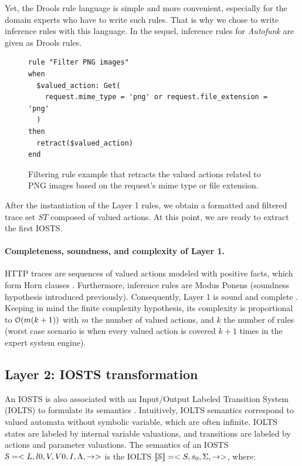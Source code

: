 Yet, the Drools rule language is simple and more convenient,
especially for the domain experts who have to write such rules.
That is why we chose to write inference rules with this language.
In the sequel, inference rules for \emph{Autofunk} are given as
Drools rules.

\begin{figure}[ht]
\begin{framed}
\begin{BVerbatim}
rule "Filter PNG images"
when
  $valued_action: Get(
    request.mime_type = 'png' or request.file_extension = 'png'
  )
then
  retract($valued_action)
end
\end{BVerbatim}
\end{framed}

    \caption{Filtering rule example that retracts the valued actions
    related to PNG images based on the request's mime type or
    file extension.}
    \label{fig:layer1:filter}
\end{figure}

After the instantiation of the Layer 1 rules, we obtain a
formatted and filtered trace set $ST$ composed of valued actions.
At this point, we are ready to extract the first IOSTS.

\paragraph{Completeness, soundness, and complexity of Layer 1.}
HTTP traces are sequences of valued actions modeled with positive
facts, which form Horn clauses \cite{JSL:9106942}.  Furthermore,
inference rules are Modus Ponens (soundness hypothesis introduced
previously).  Consequently, Layer 1 is sound and complete
\cite{logicreasoning}.  Keeping in mind the finite complexity
hypothesis, its complexity is proportional to
$\EuScript{O}(m(k+1))$ with $m$ the number of valued actions, and
$k$ the number of rules (worst case scenario is when every valued
action is covered $k+1$ times in the expert system engine).

\subsection{Layer 2: IOSTS transformation}
\label{sec:modelinf:webapps:L2}

An IOSTS is also associated with an Input/Output Labeled
Transition System (IOLTS) to formulate its semantics
\cite{rusu2005automatic,FTW05,FTW06}.  Intuitively, IOLTS
semantics correspond to valued automata without symbolic
variable, which are often infinite. IOLTS states are labeled by
internal variable valuations, and transitions are labeled by
actions and parameter valuations. The semantics of an IOSTS
$\EuScript{S}=<L,l0,V,V0,I,\Lambda,\rightarrow>$ is the IOLTS
$\llbracket \EuScript{S}\rrbracket = <S,s_0,\Sigma,\rightarrow>$,
where:

